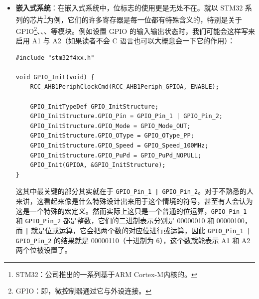 \begin{itemize}
          可是这仍然有些麻烦，有没有更简洁紧凑的写法呢？答案是有的，我们可以使用八进制数来表示这些权限。我们把每 3 位看成一个八进制数，分别表示 User、Group、Other 的权限。例如 7 在 2 进制中是 111，表示所有权限都开启，而 5 是 101，表示读和执行权限开启。\texttt{rw} 的二进制表示就是 110，对应的八进制数就是 6。而 \texttt{r} 的二进制表示就是 100，对应的八进制数就是 4。因此上面的代码就可以简化为
          \begin{verbatim}
chmod 644 example
    \end{verbatim}

          通过这个例子我们已经可以看到了位标志是如何简化操作的，不过让我们再继续看一些例子来更好地理解位标志的应用。

    \item \textbf{嵌入式系统}：在嵌入式系统中，位标志的使用更是无处不在。就以 STM32 系列的芯片\footnote{STM32：公司推出的一系列基于ARM Cortex-M内核的。}为例，它们的许多寄存器是每一位都有特殊含义的，特别是关于 GPIO\footnote{GPIO：即，微控制器通过它与外设连接。}、、、等模块。例如设置 GPIO 的输入输出状态时，我们可能会这样写来启用 A1 与 A2（如果读者不会 C 语言也可以大概意会一下它的作用）：
          \begin{verbatim}
#include "stm32f4xx.h"

void GPIO_Init(void) {
    RCC_AHB1PeriphClockCmd(RCC_AHB1Periph_GPIOA, ENABLE);

    GPIO_InitTypeDef GPIO_InitStructure;
    GPIO_InitStructure.GPIO_Pin = GPIO_Pin_1 | GPIO_Pin_2;
    GPIO_InitStructure.GPIO_Mode = GPIO_Mode_OUT;
    GPIO_InitStructure.GPIO_OType = GPIO_OType_PP;
    GPIO_InitStructure.GPIO_Speed = GPIO_Speed_100MHz;
    GPIO_InitStructure.GPIO_PuPd = GPIO_PuPd_NOPULL;
    GPIO_Init(GPIOA, &GPIO_InitStructure);
}
    \end{verbatim}

          这其中最关键的部分其实就在于 \texttt{GPIO\_Pin\_1 | GPIO\_Pin\_2}。对于不熟悉的人来讲，这看起来像是什么特殊设计出来用于这个情境的符号，甚至有人会认为这是一个特殊的宏定义。然而实际上这只是一个普通的位运算，\texttt{GPIO\_Pin\_1} 和 \texttt{GPIO\_Pin\_2} 都是整数，它们的二进制表示分别是 00000010 和 00000100，而 \texttt{|} 就是位或运算，它会把两个数的对应位进行或运算，因此 \texttt{GPIO\_Pin\_1 | GPIO\_Pin\_2} 的结果就是 00000110（十进制为 6），这个数就能表示 A1 和 A2 两个位被设置了。


\end{itemize}
